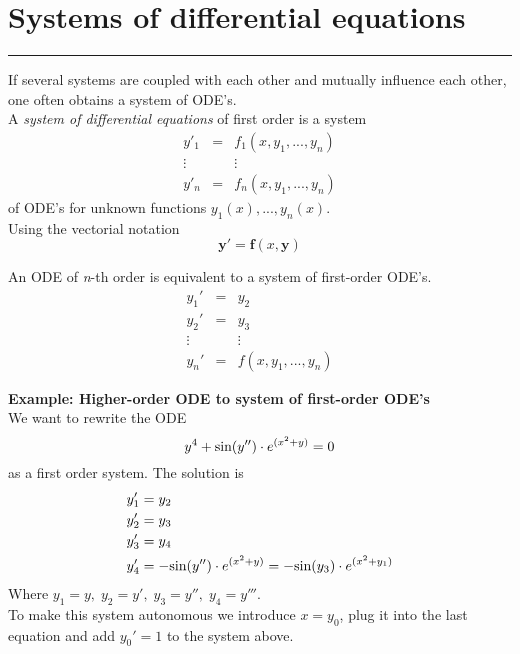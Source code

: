 \section{Systems of differential equations}
\noindent\rule[\linienAbstand]{\linewidth}{\linienDickeDick}
If several systems are coupled with each other and mutually influence each other, one often obtains a system of ODE’s.\\
A \emph{system of differential equations} of first order is a system
\begin{equation}
  \begin{matrix}
    y'_1 & = & f_1(x, y_1,...,y_n)\\
    \vdots & & \vdots \;\;\;\;\; \; \; \; \; \; \; \; \; \; \; \; \; \; \\
    y'_n & = & f_n(x, y_1,...,y_n)
\end{matrix}
\end{equation}
of ODE’s for unknown functions $y_1(x), ... , y_n(x)$.\\
Using the vectorial notation
\begin{equation}
  \mathbf{y}' = \mathbf{f}(x, \mathbf{y})
\end{equation}

An ODE of \emph{n}-th order is equivalent to a system of first-order ODE's.
\begin{equation}
  \begin{matrix}
    y_1' & = & y_2\\
    y_2' & = & y_3\\
    \vdots  &  & \vdots \\
    y_n' & = & f(x, y_1, ..., y_n)
  \end{matrix}
\end{equation}

\textbf{Example: Higher-order ODE to system of first-order ODE's}\\
We want to rewrite the ODE
\begin{equation}
  y^4 + \textup{sin}(y'') \cdot e^{(x^2 + y)} = 0
\end{equation}
as a first order system. The solution is
\begin{equation}
  \begin{split}
    y_1' &= y_2\\
    y_2' &= y_3\\
    y_3' &= y_4 \\
    y_4' &= - \textup{sin}(y'') \cdot e^{(x^2 + y)} = - \textup{sin}(y_3) \cdot e^{(x^2 + y_1)}
  \end{split}
\end{equation}
Where $y_1 = y,\; y_2 = y',\; y_3 = y'',\; y_4 = y'''$.\\
To make this system autonomous we introduce $x = y_0$, plug it into the last equation and add $y_0' = 1$ to the system above.\\


